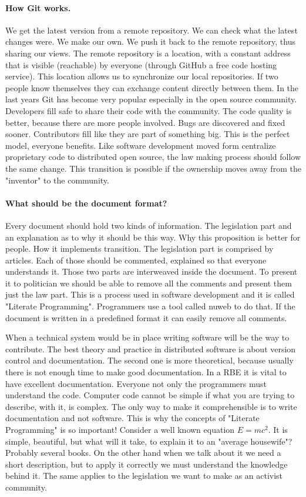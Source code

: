 \documentclass{article}
\begin{document}
\paragraph{How Git works.}
We get the latest version from a remote repository.
We can check what the latest changes were.
We make our own.
We push it back to the remote repository, thus sharing our views.
The remote repository is a location, with a constant address that is visible (reachable) by everyone (through GitHub \cite{github} a free code hosting service).
This location allows us to synchronize our local repositories.
If two people know themselves they can exchange content directly between them.
In the last years Git has become very popular especially in the open source community.
Developers fill safe to share their code with the community.
The code quality is better, because there are more people involved.
Bugs are discovered and fixed sooner.
Contributors fill like they are part of something big.
This is the perfect model, everyone benefits.
Like software development moved form centralize proprietary code to distributed open source, the law making process should follow the same change.
This transition is possible if the ownership moves away from the "inventor" to the community.

\paragraph{What should be the document format?}
Every document should hold two kinds of information.
The legislation part and an explanation as to why it should be this way.
Why this proposition is better for people.
How it implements transition.
The legislation part is comprised by articles.
Each of those should be commented, explained so that everyone understands it.
Those two parts are interweaved inside the document.
To present it to politician we should be able to remove all the comments and present them just the law part.
This is a process used in software development and it is called "Literate Programming".
Programmers use a tool called nuweb\cite{nuweb} to do that.
If the document is written in a predefined format it can easily remove all comments.

When a technical system would be in place writing software will be the way to contribute.
The best theory and practice in distributed software is about version control and documentation.
The second one is more theoretical, because usually there is not enough time to make good documentation.
In a RBE it is vital to have excellent documentation.
Everyone not only the programmers must understand the code.
Computer code cannot be simple if what you are trying to describe, with it, is complex.
The only way to make it comprehensible is to write documentation and not software.
This is why the concepts of "Literate Programming" is so important!
Consider a well known equation $E=mc^2$.
It is simple, beautiful, but what will it take, to explain it to an "average housewife"?
Probably several books.
On the other hand when we talk about it we need a short description, but to apply it correctly we must understand the knowledge behind it.
The same applies to the legislation we want to make as an activist community.
\end{document}
